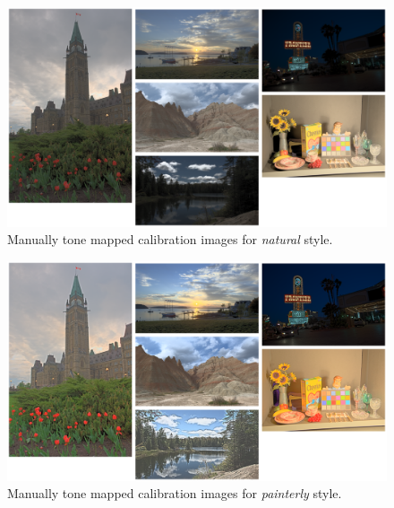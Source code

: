 \begin{figure}
\begin{center}
\includegraphics[width=\textwidth]{appendix2/calibimg_natural.pdf}
\caption{Manually tone mapped calibration images for \emph{natural} style.}
\label{fig:gallery}
\end{center}
\end{figure}

\begin{figure}
\begin{center}
\includegraphics[width=\textwidth]{appendix2/calibimg_painterly.pdf}
\caption{Manually tone mapped calibration images for \emph{painterly} style.}
\label{fig:gallery}
\end{center}
\end{figure}